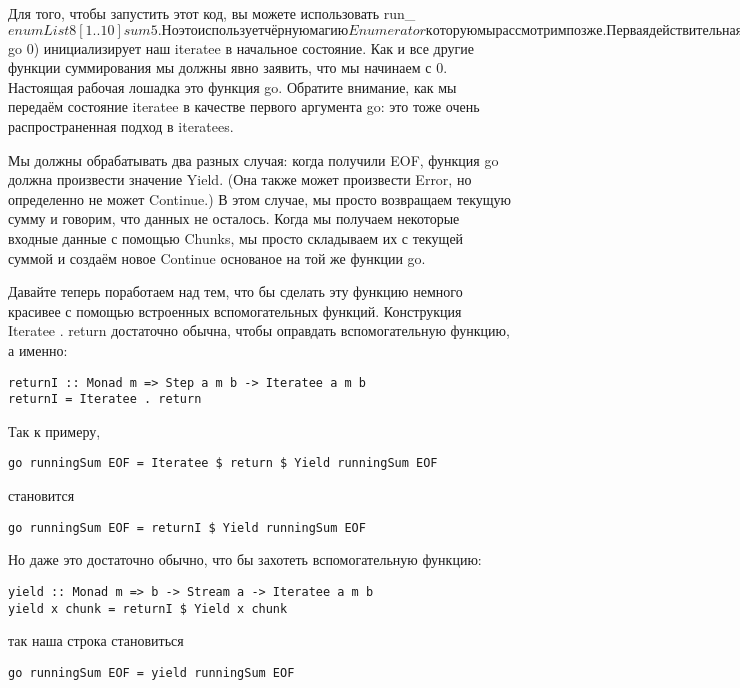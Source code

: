 Для того, чтобы запустить этот код, вы можете использовать run_ $ enumList 8 [1 .. 10] sum5. Но это использует чёрную магию Enumerator которую мы рассмотрим позже.

Первая действительная строка (Continue $ go 0) инициализирует наш iteratee в начальное состояние. Как и все другие функции суммирования мы должны явно заявить, что мы начинаем с 0. Настоящая рабочая лошадка это функция go. Обратите внимание, как мы передаём состояние iteratee в качестве первого аргумента go: это тоже очень распространенная подход в iteratees.

Мы должны обрабатывать два разных случая: когда получили EOF, функция go должна произвести значение Yield. (Она также может произвести Error, но определенно не может Continue.) В этом случае, мы просто возвращаем текущую сумму и говорим, что данных не осталось. Когда мы получаем некоторые входные данные с помощью Chunks, мы просто складываем их с текущей суммой и создаём новое Continue основаное на той же функции go.

Давайте теперь поработаем над тем, что бы сделать эту функцию немного красивее с помощью встроенных вспомогательных функций. Конструкция Iteratee . return достаточно обычна, чтобы оправдать вспомогательную функцию, а именно:

\begin{lstlisting}
returnI :: Monad m => Step a m b -> Iteratee a m b
returnI = Iteratee . return
\end{lstlisting}

Так к примеру,

\begin{lstlisting}
go runningSum EOF = Iteratee $ return $ Yield runningSum EOF
\end{lstlisting}

становится

\begin{lstlisting}
go runningSum EOF = returnI $ Yield runningSum EOF
\end{lstlisting}

Но даже это достаточно обычно, что бы захотеть вспомогательную функцию:

\begin{lstlisting}
yield :: Monad m => b -> Stream a -> Iteratee a m b
yield x chunk = returnI $ Yield x chunk
\end{lstlisting}

так наша строка становиться

\begin{lstlisting}
go runningSum EOF = yield runningSum EOF
\end{lstlisting}

